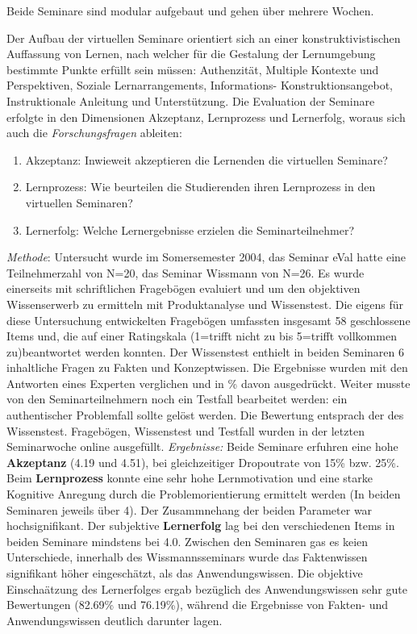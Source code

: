 Beide Seminare sind modular aufgebaut und gehen über mehrere Wochen.

Der Aufbau der virtuellen Seminare orientiert sich an einer
konstruktivistischen Auffassung von Lernen, nach welcher für die
Gestalung der Lernumgebung bestimmte Punkte erfüllt sein müssen:
Authenzität, Multiple Kontexte und Perspektiven, Soziale
Lernarrangements, Informations- Konstruktionsangebot, Instruktionale
Anleitung und Unterstützung. Die Evaluation der Seminare erfolgte in den
Dimensionen Akzeptanz, Lernprozess und Lernerfolg, woraus sich auch die
\emph{Forschungsfragen} ableiten:

\begin{enumerate}
\def\labelenumi{\arabic{enumi}.}
\itemsep1pt\parskip0pt
\item
  Akzeptanz: Inwieweit akzeptieren die Lernenden die virtuellen
  Seminare?
\item
  Lernprozess: Wie beurteilen die Studierenden ihren Lernprozess in den
  virtuellen Seminaren?
\item
  Lernerfolg: Welche Lernergebnisse erzielen die Seminarteilnehmer?
\end{enumerate}

\emph{Methode}: Untersucht wurde im Somersemester 2004, das Seminar eVal
hatte eine Teilnehmerzahl von N=20, das Seminar Wissmann von N=26. Es
wurde einerseits mit schriftlichen Fragebögen evaluiert und um den
objektiven Wissenserwerb zu ermitteln mit Produktanalyse und
Wissenstest. Die eigens für diese Untersuchung entwickelten Fragebögen
umfassten insgesamt 58 geschlossene Items und, die auf einer Ratingskala
(1=trifft nicht zu bis 5=trifft vollkommen zu)beantwortet werden
konnten. Der Wissenstest enthielt in beiden Seminaren 6 inhaltliche
Fragen zu Fakten und Konzeptwissen. Die Ergebnisse wurden mit den
Antworten eines Experten verglichen und in \% davon ausgedrückt. Weiter
musste von den Seminarteilnehmern noch ein Testfall bearbeitet werden:
ein authentischer Problemfall sollte gelöst werden. Die Bewertung
entsprach der des Wissenstest. Fragebögen, Wissenstest und Testfall
wurden in der letzten Seminarwoche online ausgefüllt. \emph{Ergebnisse:}
Beide Seminare erfuhren eine hohe \textbf{Akzeptanz} (4.19 und 4.51),
bei gleichzeitiger Dropoutrate von 15\% bzw. 25\%. Beim
\textbf{Lernprozess} konnte eine sehr hohe Lernmotivation und eine
starke Kognitive Anregung durch die Problemorientierung ermittelt werden
(In beiden Seminaren jeweils über 4). Der Zusammnehang der beiden
Parameter war hochsignifikant. Der subjektive \textbf{Lernerfolg} lag
bei den verschiedenen Items in beiden Seminare mindstens bei 4.0.
Zwischen den Seminaren gas es keien Unterschiede, innerhalb des
Wissmannsseminars wurde das Faktenwissen signifikant höher eingeschätzt,
als das Anwendungswissen. Die objektive Einschaätzung des Lernerfolges
ergab bezüglich des Anwendungswissen sehr gute Bewertungen (82.69\% und
76.19\%), während die Ergebnisse von Fakten- und Anwendungswissen
deutlich darunter lagen.

